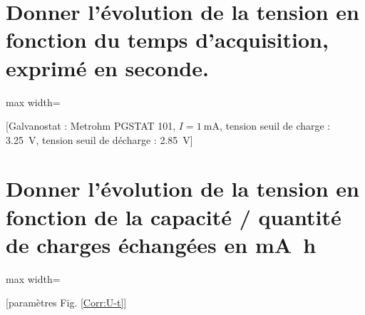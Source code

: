 \documentclass[twoside,a4paper,11pt,addpoints]{exam}%
\begin{document}
\begin{questions}

\begin{parts}

\part {\color{purple} Donner l'évolution de la tension en fonction du temps d'acquisition, exprimé en seconde.}

\begin{mybox}
\begin{solution}[6cm]
\begin{center}
\begin{adjustbox}{max width=\textwidth}

\end{adjustbox}
\label{Corr:U-t}
[Galvanostat : Metrohm PGSTAT 101, $I = \SI{1}{\milli\ampere}$, tension seuil de charge : \SI{3.25}{\volt}, tension seuil de décharge : \SI{2.85}{\volt}]
\end{center}
\end{solution}
\end{mybox}

\part {\color{purple} Donner l'évolution de la tension en fonction de la capacité / quantité de charges échangées en \si{\milli\ampere\hour}}
\begin{mybox}
\begin{solution}[6cm]
\begin{center}
\begin{adjustbox}{max width=\textwidth}

\end{adjustbox}
[paramètres Fig. \ref{Corr:U-t}]
\end{center}
\end{solution}
\end{mybox}


\end{parts}
\end{questions}
\end{document}
